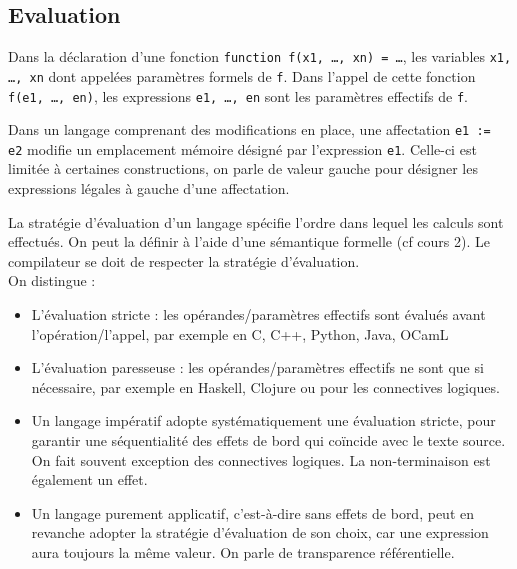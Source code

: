 \documentclass{cours}
\begin{document}
\subsection{Evaluation}
\begin{definition}
    Dans la déclaration d'une fonction \texttt{function f(x1, \dots, xn) = \dots}, les variables \texttt{x1, \dots, xn} dont appelées paramètres formels de \texttt{f}. Dans l'appel de cette fonction \texttt{f(e1, \dots, en)}, les expressions \texttt{e1, \dots, en} sont les paramètres effectifs de \texttt{f}.
\end{definition}

\begin{definition}
    Dans un langage comprenant des modifications en place, une affectation \texttt{e1 := e2} modifie un emplacement mémoire désigné par l'expression \texttt{e1}. Celle-ci est limitée à certaines constructions, on parle de valeur gauche pour désigner les expressions légales à gauche d'une affectation.
\end{definition}

\begin{definition}
    La stratégie d'évaluation d'un langage spécifie l'ordre dans lequel les calculs sont effectués. On peut la définir à l'aide d'une sémantique formelle (cf cours 2). Le compilateur se doit de respecter la stratégie d'évaluation. \\
    On distingue : 
    \begin{itemize}
        \item L'évaluation stricte : les opérandes/paramètres effectifs sont évalués avant l'opération/l'appel, par exemple en C, C++, Python, Java, OCamL
        \item L'évaluation paresseuse : les opérandes/paramètres effectifs ne sont que si nécessaire, par exemple en Haskell, Clojure ou pour les connectives logiques. 
    \end{itemize}
\end{definition}

\begin{itemize}
    \item Un langage impératif adopte systématiquement une évaluation stricte, pour garantir une séquentialité des effets de bord qui coïncide avec le texte source. On fait souvent exception des connectives logiques. La non-terminaison est également un effet. 
    \item Un langage purement applicatif, c'est-à-dire sans effets de bord, peut en revanche adopter la stratégie d'évaluation de son choix, car une expression aura toujours la même valeur. On parle de transparence référentielle.
\end{itemize}
\end{document}
